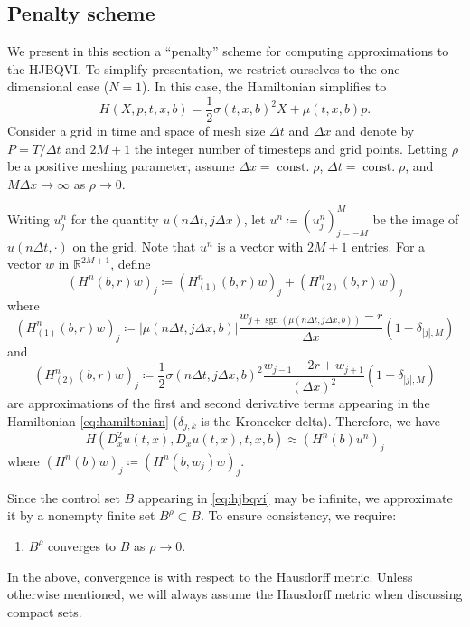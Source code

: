 \documentclass[12pt]{article}
\begin{document}
\subsection{\label{subsec:penalty_scheme}Penalty scheme}

We present in this section a ``penalty'' scheme for computing approximations
to the HJBQVI. To simplify presentation, we restrict ourselves to
the one-dimensional case ($N=1$). In this case, the Hamiltonian simplifies
to
\[
H(X,p,t,x,b)=\frac{1}{2}\sigma(t,x,b)^{2}X+\mu(t,x,b)p.
\]
Consider a grid in time and space of mesh size $\Delta t$ and
$\Delta x$ and denote by $P=T/\Delta t$ and $2M+1$ the integer
number of timesteps and grid points. Letting $\rho$ be a positive
meshing parameter, assume $\Delta x={\operatorname{const.}}\rho$, $\Delta t={\operatorname{const.}}\rho$,
and $M\Delta x\rightarrow\infty$ as $\rho\rightarrow0$.

Writing $u_{j}^{n}$ for the quantity $u(n\Delta t,j\Delta x)$, let
$u^{n}\coloneqq(u_{j}^{n})_{j=-M}^{M}$ be the image of $u(n\Delta t,\cdot)$
on the grid. Note that $u^{n}$ is a vector with $2M+1$ entries.
For a vector $w$ in $\mathbb{R}^{2M+1}$, define
\[
(H^{n}(b,r)w)_{j}\coloneqq(H_{(1)}^{n}(b,r)w)_{j}+(H_{(2)}^{n}(b,r)w)_{j}
\]
where
\[
(H_{(1)}^{n}(b,r)w)_{j}\coloneqq\left|\mu(n\Delta t,j\Delta x,b)\right|\frac{w_{j+\operatorname{sgn}(\mu(n\Delta t,j\Delta x,b))}-r}{\Delta x}\left(1-\delta_{|j|,M}\right)
\]
and
\begin{equation}
(H_{(2)}^{n}(b,r)w)_{j}\coloneqq\frac{1}{2}\sigma(n\Delta t,j\Delta x,b)^{2}\frac{w_{j-1}-2r+w_{j+1}}{\left(\Delta x\right)^{2}}\left(1-\delta_{|j|,M}\right)\label{eq:diffusion_discretization}
\end{equation}
are approximations of the first and second derivative terms appearing
in the Hamiltonian \eqref{eq:hamiltonian} ($\delta_{j,k}$ is the
Kronecker delta). Therefore, we have
\[
H(D_{x}^{2}u(t,x),D_{x}u(t,x),t,x,b)\approx(H^{n}(b)u^{n})_{j}
\]
where $(H^{n}(b)w)_{j}\coloneqq(H^{n}(b,w_{j})w)_{j}$.

Since the control set $B$ appearing in \eqref{eq:hjbqvi} may be
infinite, we approximate it by a nonempty finite set $B^{\rho}\subset B$.
To ensure consistency, we require:
\begin{enumerate}[label=(H\arabic*),start=6]
\item $B^{\rho}$ converges to $B$ as $\rho\rightarrow0$.
\end{enumerate}
In the above, convergence is with respect to the Hausdorff metric.
Unless otherwise mentioned, we will always assume the Hausdorff metric
when discussing compact sets.
\end{document}
